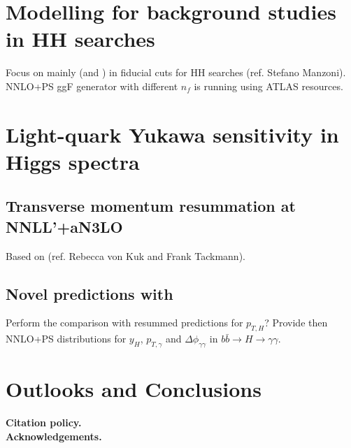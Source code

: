 \documentclass[11pt,a4paper]{article}
\begin{document}
\section{Modelling \bbH{} for background studies in HH searches}
Focus on  mainly (and ) in fiducial cuts for HH searches (ref. Stefano Manzoni). NNLO+PS ggF generator with different $n_f$ is running using ATLAS resources.


\section{Light-quark Yukawa sensitivity in Higgs spectra}
\subsection{Transverse momentum resummation at NNLL'+aN3LO}
Based on \cite{Cal:2023mib} (ref. Rebecca von Kuk and Frank Tackmann).

\subsection{Novel predictions with \minnlo{}}
Perform the comparison with resummed predictions for $p_{T,H}$? Provide then NNLO+PS distributions for $y_H$, $p_{T,\gamma}$ and $\Delta\phi_{\gamma \gamma}$ in $b\bar b \rightarrow H \rightarrow \gamma \gamma$.

\section{Outlooks and Conclusions}

\textbf{Citation policy. }\\

\textbf{Acknowledgements. }



\end{document}
